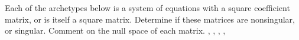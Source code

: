 Each of the archetypes below is a system of equations with a square coefficient matrix, or is itself a square matrix.  Determine if these matrices are nonsingular, or singular.  Comment on the null space of each matrix.\newline\newline
{},
,
,
,
